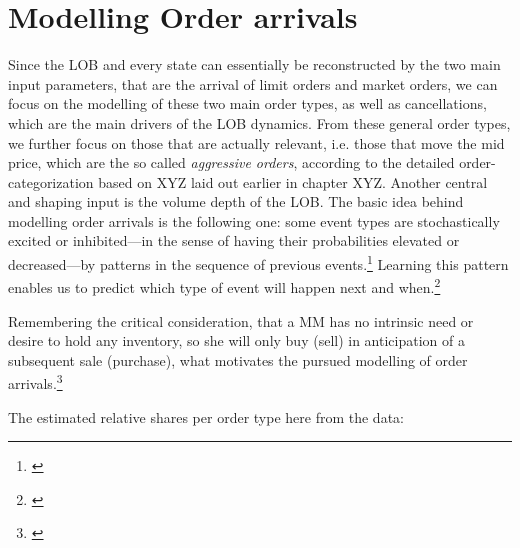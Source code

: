 \documentclass[12pt,a4paper]{cau_thesis}
\begin{document}
\section{Modelling Order arrivals}\label{sec:modelling_order_arrivals}
Since the LOB and every state can essentially be reconstructed by the
two main input parameters, that are the arrival of limit orders and
market orders, we can focus on the modelling of these two main order
types, as well as cancellations, which are the main drivers of the
LOB dynamics. From these general order types, we further focus on
those that are actually relevant, i.e. those that move the mid price,
which are the so called \textit{aggressive orders}, according to the
detailed order-categorization based on XYZ laid out earlier in
chapter XYZ. Another central and shaping input is the volume depth of
the LOB.\cite{choi2021optimal} The basic idea behind modelling order
arrivals is the following one: some event types are stochastically
excited or inhibited—in the sense of having their probabilities
elevated or decreased—by patterns in the sequence of previous
events.\footnote{\cite[See ][, p.1]{mei2017neural}} Learning this
pattern enables us to predict which type of event will happen next
and when.\footnote{\cite[See ][, p.1]{mei2017neural}}

Remembering the critical consideration, that a MM has no intrinsic
need or desire to hold any inventory, so she will only buy (sell) in
anticipation of a subsequent sale (purchase), what motivates the
pursued modelling of order arrivals.\footnote{\cite[See ][,
        p.21]{cartea2015algorithmic}}

The estimated relative shares per order type here from the data:
\begin{figure}[htbp]
    \vspace*{0.5cm}
    \centering
    \label{fig:rel_share_order_types}
\end{figure}
\end{document}
